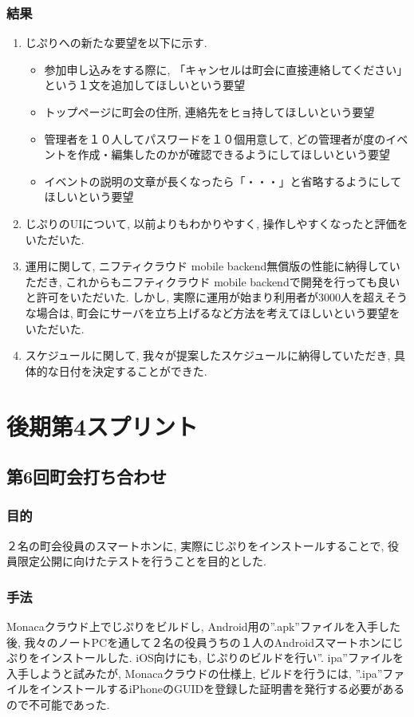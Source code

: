 \subsubsection{結果}
\begin{enumerate}
    \item じぷりへの新たな要望を以下に示す.
    \begin{itemize}
        \item 参加申し込みをする際に, 「キャンセルは町会に直接連絡してください」という１文を追加してほしいという要望
        \item トップページに町会の住所, 連絡先をヒョ持してほしいという要望
        \item 管理者を１０人してパスワードを１０個用意して, どの管理者が度のイベントを作成・編集したのかが確認できるようにしてほしいという要望
        \item イベントの説明の文章が長くなったら「・・・」と省略するようにしてほしいという要望
    \end{itemize}
    \item じぷりのUIについて, 以前よりもわかりやすく, 操作しやすくなったと評価をいただいた.
    \item 運用に関して, ニフティクラウド mobile backend無償版の性能に納得していただき, これからもニフティクラウド mobile backendで開発を行っても良いと許可をいただいた.
    しかし, 実際に運用が始まり利用者が3000人を超えそうな場合は, 町会にサーバを立ち上げるなど方法を考えてほしいという要望をいただいた.

    \item スケジュールに関して, 我々が提案したスケジュールに納得していただき, 具体的な日付を決定することができた.
\end{enumerate}

\section{後期第4スプリント}
\subsection{第6回町会打ち合わせ}
\subsubsection{目的}
２名の町会役員のスマートホンに, 実際にじぷりをインストールすることで, 役員限定公開に向けたテストを行うことを目的とした.
\subsubsection{手法}
Monacaクラウド上でじぷりをビルドし, Android用の”.apk”ファイルを入手した後, 我々のノートPCを通して２名の役員うちの１人のAndroidスマートホンにじぷりをインストールした. iOS向けにも, じぷりのビルドを行い”.
ipa”ファイルを入手しようと試みたが, Monacaクラウドの仕様上, ビルドを行うには, ”.ipa”ファイルをインストールするiPhoneのGUIDを登録した証明書を発行する必要があるので不可能であった.
